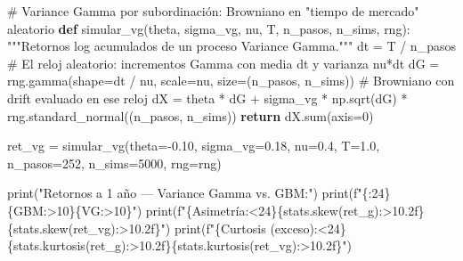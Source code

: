 \documentclass[
  spanish,
  letterpaper,
  DIV=11,
  numbers=noendperiod]{scrreprt}
\newenvironment{Shaded}{\begin{snugshade}}{\end{snugshade}}
\newcommand{\BuiltInTok}[1]{\textcolor[rgb]{0.00,0.23,0.31}{#1}}
\newcommand{\CommentTok}[1]{\textcolor[rgb]{0.37,0.37,0.37}{#1}}
\newcommand{\ControlFlowTok}[1]{\textcolor[rgb]{0.00,0.23,0.31}{\textbf{#1}}}
\newcommand{\DecValTok}[1]{\textcolor[rgb]{0.68,0.00,0.00}{#1}}
\newcommand{\FloatTok}[1]{\textcolor[rgb]{0.68,0.00,0.00}{#1}}
\newcommand{\KeywordTok}[1]{\textcolor[rgb]{0.00,0.23,0.31}{\textbf{#1}}}
\newcommand{\NormalTok}[1]{\textcolor[rgb]{0.00,0.23,0.31}{#1}}
\newcommand{\OperatorTok}[1]{\textcolor[rgb]{0.37,0.37,0.37}{#1}}
\newcommand{\SpecialCharTok}[1]{\textcolor[rgb]{0.37,0.37,0.37}{#1}}
\newcommand{\SpecialStringTok}[1]{\textcolor[rgb]{0.13,0.47,0.30}{#1}}
\newcommand{\StringTok}[1]{\textcolor[rgb]{0.13,0.47,0.30}{#1}}
\begin{document}
\label{variance-gamma}
\begin{Shaded}
\begin{Highlighting}[]
\CommentTok{\# Variance Gamma por subordinación: Browniano en "tiempo de mercado" aleatorio}
\KeywordTok{def}\NormalTok{ simular\_vg(theta, sigma\_vg, nu, T, n\_pasos, n\_sims, rng):}
    \CommentTok{"""Retornos log acumulados de un proceso Variance Gamma."""}
\NormalTok{    dt }\OperatorTok{=}\NormalTok{ T }\OperatorTok{/}\NormalTok{ n\_pasos}
    \CommentTok{\# El reloj aleatorio: incrementos Gamma con media dt y varianza nu*dt}
\NormalTok{    dG }\OperatorTok{=}\NormalTok{ rng.gamma(shape}\OperatorTok{=}\NormalTok{dt }\OperatorTok{/}\NormalTok{ nu, scale}\OperatorTok{=}\NormalTok{nu, size}\OperatorTok{=}\NormalTok{(n\_pasos, n\_sims))}
    \CommentTok{\# Browniano con drift evaluado en ese reloj}
\NormalTok{    dX }\OperatorTok{=}\NormalTok{ theta }\OperatorTok{*}\NormalTok{ dG }\OperatorTok{+}\NormalTok{ sigma\_vg }\OperatorTok{*}\NormalTok{ np.sqrt(dG) }\OperatorTok{*}\NormalTok{ rng.standard\_normal((n\_pasos, n\_sims))}
    \ControlFlowTok{return}\NormalTok{ dX.}\BuiltInTok{sum}\NormalTok{(axis}\OperatorTok{=}\DecValTok{0}\NormalTok{)}

\NormalTok{ret\_vg }\OperatorTok{=}\NormalTok{ simular\_vg(theta}\OperatorTok{={-}}\FloatTok{0.10}\NormalTok{, sigma\_vg}\OperatorTok{=}\FloatTok{0.18}\NormalTok{, nu}\OperatorTok{=}\FloatTok{0.4}\NormalTok{, T}\OperatorTok{=}\FloatTok{1.0}\NormalTok{,}
\NormalTok{                    n\_pasos}\OperatorTok{=}\DecValTok{252}\NormalTok{, n\_sims}\OperatorTok{=}\DecValTok{5000}\NormalTok{, rng}\OperatorTok{=}\NormalTok{rng)}

\BuiltInTok{print}\NormalTok{(}\StringTok{"Retornos a 1 año — Variance Gamma vs. GBM:"}\NormalTok{)}
\BuiltInTok{print}\NormalTok{(}\SpecialStringTok{f"}\SpecialCharTok{\{}\StringTok{\textquotesingle{}\textquotesingle{}}\SpecialCharTok{:24\}\{}\StringTok{\textquotesingle{}GBM\textquotesingle{}}\SpecialCharTok{:\textgreater{}10\}\{}\StringTok{\textquotesingle{}VG\textquotesingle{}}\SpecialCharTok{:\textgreater{}10\}}\SpecialStringTok{"}\NormalTok{)}
\BuiltInTok{print}\NormalTok{(}\SpecialStringTok{f"}\SpecialCharTok{\{}\StringTok{\textquotesingle{}Asimetría\textquotesingle{}}\SpecialCharTok{:\textless{}24\}\{}\NormalTok{stats}\SpecialCharTok{.}\NormalTok{skew(ret\_g)}\SpecialCharTok{:\textgreater{}10.2f\}\{}\NormalTok{stats}\SpecialCharTok{.}\NormalTok{skew(ret\_vg)}\SpecialCharTok{:\textgreater{}10.2f\}}\SpecialStringTok{"}\NormalTok{)}
\BuiltInTok{print}\NormalTok{(}\SpecialStringTok{f"}\SpecialCharTok{\{}\StringTok{\textquotesingle{}Curtosis (exceso)\textquotesingle{}}\SpecialCharTok{:\textless{}24\}\{}\NormalTok{stats}\SpecialCharTok{.}\NormalTok{kurtosis(ret\_g)}\SpecialCharTok{:\textgreater{}10.2f\}\{}\NormalTok{stats}\SpecialCharTok{.}\NormalTok{kurtosis(ret\_vg)}\SpecialCharTok{:\textgreater{}10.2f\}}\SpecialStringTok{"}\NormalTok{)}
\end{Highlighting}
\end{Shaded}
\end{document}
